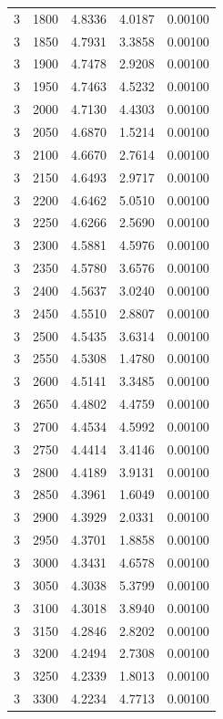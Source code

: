 \begin{longtable}{ccccc}
    3 & 1800 & 4.8336 & 4.0187 & 0.00100 \\
    3 & 1850 & 4.7931 & 3.3858 & 0.00100 \\
    3 & 1900 & 4.7478 & 2.9208 & 0.00100 \\
    3 & 1950 & 4.7463 & 4.5232 & 0.00100 \\
    3 & 2000 & 4.7130 & 4.4303 & 0.00100 \\
    3 & 2050 & 4.6870 & 1.5214 & 0.00100 \\
    3 & 2100 & 4.6670 & 2.7614 & 0.00100 \\
    3 & 2150 & 4.6493 & 2.9717 & 0.00100 \\
    3 & 2200 & 4.6462 & 5.0510 & 0.00100 \\
    3 & 2250 & 4.6266 & 2.5690 & 0.00100 \\
    3 & 2300 & 4.5881 & 4.5976 & 0.00100 \\
    3 & 2350 & 4.5780 & 3.6576 & 0.00100 \\
    3 & 2400 & 4.5637 & 3.0240 & 0.00100 \\
    3 & 2450 & 4.5510 & 2.8807 & 0.00100 \\
    3 & 2500 & 4.5435 & 3.6314 & 0.00100 \\
    3 & 2550 & 4.5308 & 1.4780 & 0.00100 \\
    3 & 2600 & 4.5141 & 3.3485 & 0.00100 \\
    3 & 2650 & 4.4802 & 4.4759 & 0.00100 \\
    3 & 2700 & 4.4534 & 4.5992 & 0.00100 \\
    3 & 2750 & 4.4414 & 3.4146 & 0.00100 \\
    3 & 2800 & 4.4189 & 3.9131 & 0.00100 \\
    3 & 2850 & 4.3961 & 1.6049 & 0.00100 \\
    3 & 2900 & 4.3929 & 2.0331 & 0.00100 \\
    3 & 2950 & 4.3701 & 1.8858 & 0.00100 \\
    3 & 3000 & 4.3431 & 4.6578 & 0.00100 \\
    3 & 3050 & 4.3038 & 5.3799 & 0.00100 \\
    3 & 3100 & 4.3018 & 3.8940 & 0.00100 \\
    3 & 3150 & 4.2846 & 2.8202 & 0.00100 \\
    3 & 3200 & 4.2494 & 2.7308 & 0.00100 \\
    3 & 3250 & 4.2339 & 1.8013 & 0.00100 \\
    3 & 3300 & 4.2234 & 4.7713 & 0.00100 \\

\end{longtable}
